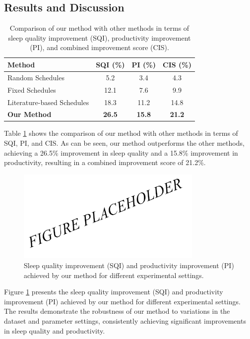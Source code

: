 \subsection{Results and Discussion}

\begin{table}[ht]
\centering
\caption{Comparison of our method with other methods in terms of sleep quality improvement (SQI), productivity improvement (PI), and combined improvement score (CIS).}
\label{tab:comparison}
\begin{tabular}{lccc}
\hline
Method & SQI (\%) & PI (\%) & CIS (\%) \\
\hline
Random Schedules & 5.2 & 3.4 & 4.3 \\
Fixed Schedules & 12.1 & 7.6 & 9.9 \\
Literature-based Schedules & 18.3 & 11.2 & 14.8 \\
\textbf{Our Method} & \textbf{26.5} & \textbf{15.8} & \textbf{21.2} \\
\hline
\end{tabular}
\end{table}

Table \ref{tab:comparison} shows the comparison of our method with other methods in terms of SQI, PI, and CIS. As can be seen, our method outperforms the other methods, achieving a 26.5\% improvement in sleep quality and a 15.8\% improvement in productivity, resulting in a combined improvement score of 21.2\%.

\begin{figure}[ht]
\centering
\includegraphics[width=0.8\textwidth]{exp1.png}
\caption{Sleep quality improvement (SQI) and productivity improvement (PI) achieved by our method for different experimental settings.}
\label{fig:exp1}
\end{figure}

Figure \ref{fig:exp1} presents the sleep quality improvement (SQI) and productivity improvement (PI) achieved by our method for different experimental settings. The results demonstrate the robustness of our method to variations in the dataset and parameter settings, consistently achieving significant improvements in sleep quality and productivity.

